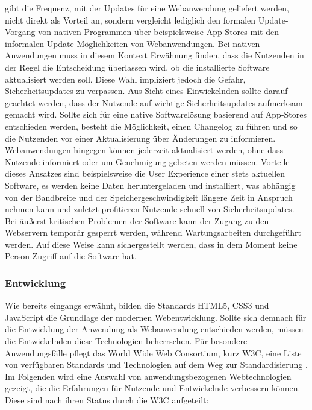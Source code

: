 \documentclass[a4paper]{scrartcl}
\begin{document}
\textcite[28]{Jobe} gibt die Frequenz, mit der Updates für eine Webanwendung geliefert werden, nicht direkt als Vorteil an, sondern vergleicht lediglich den formalen Update-Vorgang von nativen Programmen über beispielsweise App-Stores mit den informalen Update-Möglichkeiten von Webanwendungen. Bei nativen Anwendungen muss in diesem Kontext Erwähnung finden, dass die Nutzenden in der Regel die Entscheidung überlassen wird, ob die installierte Software aktualisiert werden soll. Diese Wahl impliziert jedoch die Gefahr, Sicherheitsupdates zu verpassen. Aus Sicht eines Einwickelnden sollte darauf geachtet werden, dass der Nutzende auf wichtige Sicherheitsupdates aufmerksam gemacht wird. Sollte sich für eine native Softwarelösung basierend auf App-Stores entschieden werden, besteht die Möglichkeit, einen Changelog zu führen und so die Nutzenden vor einer Aktualisierung über Änderungen zu informieren. \\
Webanwendungen hingegen können jederzeit aktualisiert werden, ohne dass Nutzende informiert oder um Genehmigung gebeten werden müssen. Vorteile dieses Ansatzes sind beispielsweise die User Experience einer stets aktuellen Software, es werden keine Daten heruntergeladen und installiert, was abhängig von der Bandbreite und der Speichergeschwindigkeit längere Zeit in Anspruch nehmen kann und zuletzt profitieren Nutzende schnell von Sicherheitsupdates. Bei äußerst kritischen Problemen der Software kann der Zugang zu den Webservern temporär gesperrt werden, während Wartungsarbeiten durchgeführt werden. Auf diese Weise kann sichergestellt werden, dass in dem Moment keine Person Zugriff auf die Software hat.

\subsubsection{Entwicklung}

Wie bereits eingangs erwähnt, bilden die Standards HTML5, CSS3 und JavaScript die Grundlage der modernen Webentwicklung. Sollte sich demnach für die Entwicklung der Anwendung als Webanwendung entschieden werden, müssen die Entwickelnden diese Technologien beherrschen. Für besondere Anwendungsfälle pflegt das World Wide Web Consortium, kurz W3C, eine Liste von verfügbaren Standards und Technologien auf dem Weg zur Standardisierung \autocite{W3C}. Im Folgenden wird eine Auswahl von anwendungsbezogenen Webtechnologien gezeigt, die die Erfahrungen für Nutzende und Entwickelnde verbessern können. Diese sind nach ihren Status durch die W3C aufgeteilt:
\end{document}
